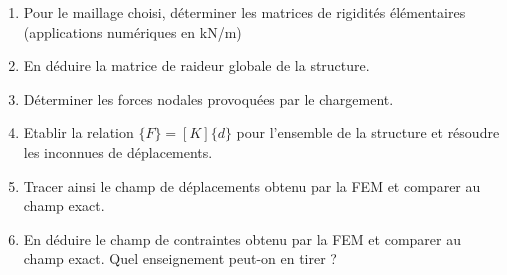 \documentclass[11pt,a4paper]{report}
\begin{document}
\begin{enumerate}[start=7]
  \item Pour le maillage choisi, déterminer les matrices de rigidités élémentaires (applications numériques en kN/m)\\
  \item En déduire la matrice de raideur globale de la structure.\\
  \item Déterminer les forces nodales provoquées par le chargement.\\
  \item Etablir la relation $\{F\}=[K]\{d\}$ pour l'ensemble de la structure et résoudre les inconnues de déplacements.\\
  \item Tracer ainsi le champ de déplacements obtenu par la FEM et comparer au champ exact.\\
  \item En déduire le champ de contraintes obtenu par la FEM et comparer au champ exact. Quel enseignement peut-on en tirer ?
\end{enumerate}
\end{document}
